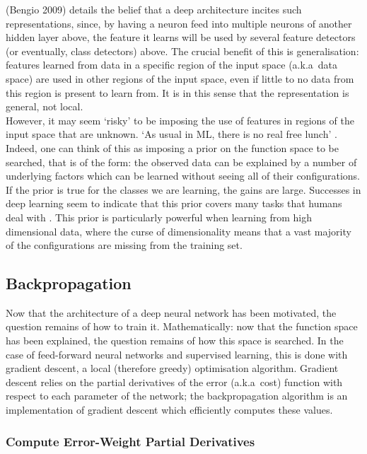 \documentclass[a4paper,11pt]{article}
\begin{document}
(Bengio 2009) \cite{DL-book} details the belief that a deep architecture incites such representations, since, by having a neuron feed into multiple neurons of another hidden layer above, the feature it learns will be used by several feature detectors (or eventually, class detectors) above. The crucial benefit of this is generalisation: features learned from data in a specific region of the input space (a.k.a\ data space) are used in other regions of the input space, even if little to no data from this region is present to learn from. It is in this sense that the representation is general, not local. \\

However, it may seem `risky' to be imposing the use of features in regions of the input space that are unknown. `As usual in ML, there is no real free lunch' \cite{Bengio_G+}. Indeed, one can think of this as imposing a prior on the function space to be searched, that is of the form: the observed data can be explained by a number of underlying factors which can be learned without seeing all of their configurations. If the prior is true for the classes we are learning, the gains are large. Successes in deep learning seem to indicate that this prior covers many tasks that humans deal with \cite{Bengio_G+}. This prior is particularly powerful when learning from high dimensional data, where the curse of dimensionality means that a vast majority of the configurations are missing from the training set. \\

\clearpage

\subsection{Backpropagation}

Now that the architecture of a deep neural network has been motivated, the question remains of how to train it. Mathematically: now that the function space has been explained, the question remains of how this space is searched. In the case of feed-forward neural networks and supervised learning, this is done with gradient descent, a local (therefore greedy) optimisation algorithm. Gradient descent relies on the partial derivatives of the error (a.k.a\ cost) function with respect to each parameter of the network; the backpropagation algorithm is an implementation of gradient descent which efficiently computes these values.
  
\subsubsection{Compute Error-Weight Partial Derivatives}
\end{document}
